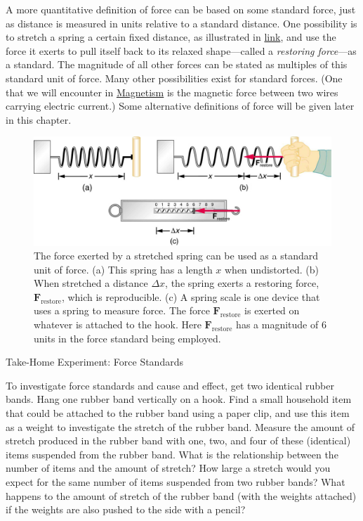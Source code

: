 \documentclass[
]{book}
\newenvironment{note}{}{}
\begin{document}
A more quantitative definition of force can be based on some standard
force, just as distance is measured in units relative to a standard
distance. One possibility is to stretch a spring a certain fixed
distance, as illustrated in
\protect\hyperlink{import-auto-id2608835}{link}, and use the
force it exerts to pull itself back to its relaxed shape---called a
\emph{restoring force}---as a standard. The magnitude of all other forces can
be stated as multiples of this standard unit of force. Many other
possibilities exist for standard forces. (One that we will encounter in
\href{/m55373}{Magnetism} is the magnetic force between two wires carrying
electric current.) Some alternative definitions of force will be given
later in this chapter.

\begin{figure}
\hypertarget{import-auto-id2608835}{%
\centering
\includegraphics{images/Figure_04_01_02.jpg}
\caption{The force exerted by a stretched spring can be used as a standard unit
of force. (a) This spring has a length \(x{}\) when undistorted. (b) When
stretched a distance \({\Delta x}{}\), the spring exerts a restoring
force, \(\textbf{F}_{\text{restore}}{}\), which is reproducible. (c) A
spring scale is one device that uses a spring to measure force. The
force \(\textbf{F}_{\text{restore}}{}\) is exerted on whatever is attached
to the hook. Here \(\textbf{F}_{\text{restore}}{}\) has a magnitude of 6
units in the force standard being
employed.}\label{import-auto-id2608835}
}
\end{figure}

\hypertarget{fs-id2631420}{}
\begin{note}

Take-Home Experiment: Force Standards

To investigate force standards and cause and effect, get two identical
rubber bands. Hang one rubber band vertically on a hook. Find a small
household item that could be attached to the rubber band using a paper
clip, and use this item as a weight to investigate the stretch of the
rubber band. Measure the amount of stretch produced in the rubber band
with one, two, and four of these (identical) items suspended from the
rubber band. What is the relationship between the number of items and
the amount of stretch? How large a stretch would you expect for the same
number of items suspended from two rubber bands? What happens to the
amount of stretch of the rubber band (with the weights attached) if the
weights are also pushed to the side with a pencil?

\end{note}
\end{document}
